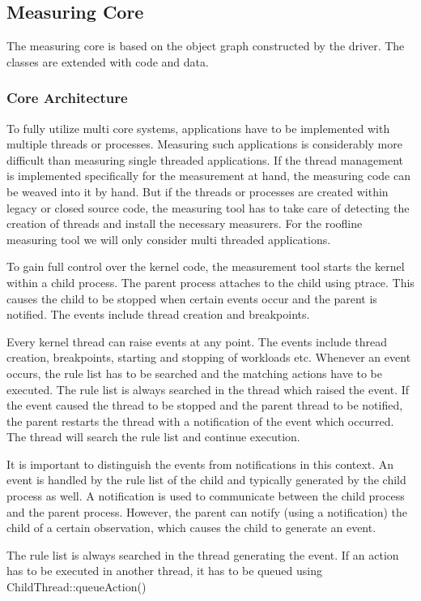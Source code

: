 \documentclass[a4paper,12pt]{article}
\newcommand{\method}[1]{\textsf{#1}}
\begin{document}
\subsection{Measuring Core}
The measuring core is based on the object graph constructed by the driver. The
classes are extended with code and data.

\subsubsection{Core Architecture}
To fully utilize multi core systems, applications have to be implemented with
multiple threads or processes. Measuring such applications is considerably more
difficult than measuring single threaded applications. If the thread management
is implemented specifically for the measurement at hand, the measuring code can
be weaved into it by hand. But if the threads or processes are created within
legacy or closed source code, the measuring tool has to take care of detecting
the creation of threads and install the necessary measurers. For the roofline
measuring tool we will only consider multi threaded applications.

To gain full control over the kernel code, the measurement tool starts the
kernel within a child process. The parent process attaches to the child using
ptrace. This causes the child to be stopped when certain events occur and the
parent is notified. The events include thread creation and breakpoints.

Every kernel thread can raise events at any point. The events include thread
creation, breakpoints, starting and stopping of workloads etc. Whenever an event
occurs, the rule list has to be searched and the matching actions have to be
executed. The rule list is always searched in the thread which raised the event.
If the event caused the thread to be stopped and the parent thread to be
notified, the parent restarts the thread with a notification of the event which
occurred. The thread will search the rule list and continue execution.

It is important to distinguish the events from notifications in this context. An
event is handled by the rule list of the child and typically generated by the
child process as well. A notification is used to communicate between the child
process and the parent process. However, the parent can notify (using a
notification) the child of a certain observation, which causes the child to
generate an event.

The rule list is always searched in the thread generating the event. If an
action has to be executed in another thread, it has to be queued using
\method{ChildThread::queueAction()}
\end{document}
